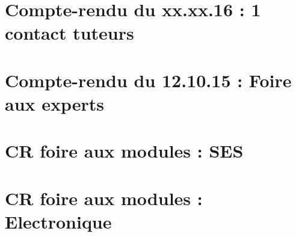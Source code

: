 \section{Compte-rendu du xx.xx.16 : 1 contact tuteurs}
	\label{CR1}


\section{Compte-rendu du 12.10.15 : Foire aux experts}
	\label{CR2}


\section{CR foire aux modules : SES}
	\label{CR3.1}


\section{CR foire aux modules : Electronique}
	\label{CR3.2}

